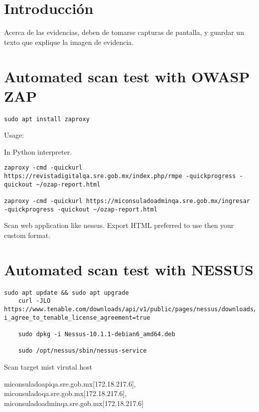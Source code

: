 


\section{Introducción}

Acerca de las evidencias, deben de tomarse capturas de pantalla, y guardar un texto que explique la imagen de evidencia.

\section{Automated scan test with OWASP ZAP}


\begin{lstlisting}[numbers=none]
sudo apt install zaproxy
\end{lstlisting}
 
Usage:

In Python interpreter.

\begin{lstlisting}[numbers=none]
zaproxy -cmd -quickurl https://revistadigitalqa.sre.gob.mx/index.php/rmpe -quickprogress -quickout ~/ozap-report.html 

zaproxy -cmd -quickurl https://miconsuladoadminqa.sre.gob.mx/ingresar -quickprogress -quickout ~/ozap-report.html
\end{lstlisting}

Scan web application like nessus.
Export HTML preferred to use then your custom format.

\section{Automated scan test with NESSUS}


\begin{lstlisting}[numbers=none]
	sudo apt update && sudo apt upgrade
	curl -JLO https://www.tenable.com/downloads/api/v1/public/pages/nessus/downloads/16503/download?i_agree_to_tenable_license_agreement=true
	 
	sudo dpkg -i Nessus-10.1.1-debian6_amd64.deb
	 
	sudo /opt/nessus/sbin/nessus-service
\end{lstlisting}
 
Scan target mist virutal host 

miconsuladoapiqa.sre.gob.mx[172.18.217.6], miconsuladoqa.sre.gob.mx[172.18.217.6], miconsuladoadminqa.sre.gob.mx[172.18.217.6]

